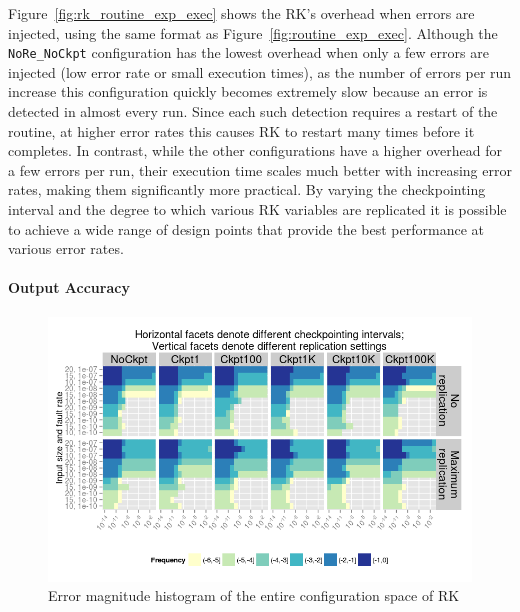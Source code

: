 \documentclass{sig-alternate}
\begin{document}
Figure~\ref{fig:rk_routine_exp_exec} shows the RK's overhead when errors are injected, using the same format as Figure~\ref{fig:routine_exp_exec}.
Although the \texttt{NoRe\_NoCkpt} configuration has the lowest overhead when only a few errors are injected (low error rate or small execution times), as the number of errors per run increase this configuration quickly becomes extremely slow because an error is detected in almost every run.
Since each such detection requires a restart of the routine, at higher error rates this causes RK to restart many times before it completes.
In contrast, while the other configurations have a higher overhead for a few errors per run, their execution time scales much better with increasing error rates, making them significantly more practical.
By varying the checkpointing interval and the degree to which various RK variables are replicated it is possible to achieve a wide range of design points that provide the best performance at various error rates.

\paragraph{Output Accuracy}

\begin{figure}[ht!]
\centering
\includegraphics[width=1.00\columnwidth]{figs/4_1_1_Exp2_2_Heatmap_Error_ConfSpace_RK4.png}
\caption{Error magnitude histogram of the entire configuration space of RK}
\label{fig:rt_algo_err_heatmap}
\end{figure}
\end{document}
